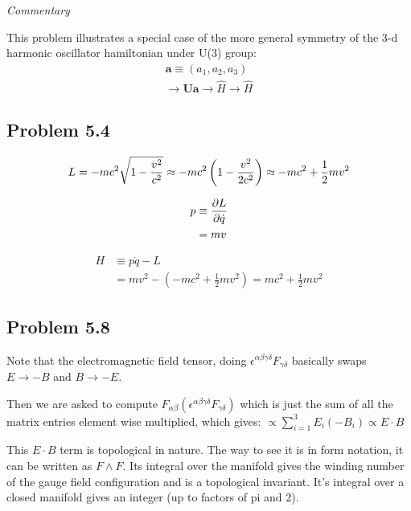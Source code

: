 \documentclass[11pt]{article}
\theoremstyle{definition}
\begin{document}
\emph{Commentary}

This problem illustrates a special case of the more general symmetry of the 3-d harmonic oscillator hamiltonian under U(3) group:
\begin{align}
\mathbf{a} \equiv (a_1, a_2, a_3)  \\
\rightarrow \mathbf{U} \mathbf{a} \rightarrow \hat{H} \rightarrow \hat{H}
\end{align}


\newpage
\subsection{Problem 5.4}

\begin{align}
L =-mc^2 \sqrt{1 - {v^2 \over c^2}} \approx -mc^2 \left(1 - {v^2 \over 2 c^2} \right) \approx -mc^2 + \frac12 m v^2 
\end{align}


\begin{align}
p & \equiv {\partial L \over \partial \dot{q}} \\
&= mv
\end{align}

\begin{align}
H &\equiv p \dot{q} - L \\
&= mv^2 - (-mc^2 + \frac12 mv^2) = mc^2 + \frac12 m v^2
\end{align}

\subsection{Problem 5.8}

Note that the electromagnetic field tensor, doing $\epsilon^{\alpha \beta \gamma \delta} F_{\gamma \delta}$ basically swaps $ E \rightarrow -B$ and $B \rightarrow -E$.

Then we are asked to compute $F_{\alpha \beta} \left(\epsilon^{\alpha \beta \gamma \delta } F_{\gamma \delta} \right)$ which is just the sum of all the matrix entries element wise multiplied, which gives:
$\propto \sum_{i=1}^3 E_i (-B_i) \propto E \cdot B$

This $E \cdot B$ term is topological in nature. The way to see it is in form notation, it can be written as $F \wedge F$.  Its integral over the manifold gives the winding number of the gauge field configuration and is a topological invariant.  It's integral over a closed manifold gives an integer (up to factors of pi and 2).
\end{document}

